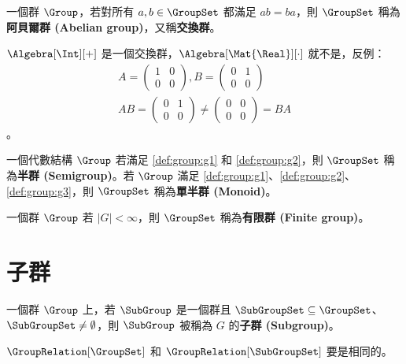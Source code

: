 \documentclass[12pt,a4paper,oneside]{report}
\begin{document}
\begin{CJK}{UTF8}{bkai}
\begin{mydef}[阿貝爾群]
\label{def:group:abelian_group}
一個群 $\Group$，若對所有 $a,b\in{\GroupSet}$ 都滿足 $ab=ba$，則 $\GroupSet$ 稱為\textbf{阿貝爾群 (Abelian group)}，又稱\textbf{交換群}。
\end{mydef}
\begin{myexample}
$\Algebra[\Int][+]$ 是一個交換群，$\Algebra[\Mat{\Real}][\cdot]$ 就不是，反例：
\begin{align*}
A=\left(\begin{array}{cc}
1 & 0\\
0 & 0
\end{array}\right),
B=\left(\begin{array}{cc}
0 & 1\\
0 & 0
\end{array}\right)\\
AB=\left(\begin{array}{cc}
0 & 1\\
0 & 0
\end{array}\right)\neq\left(\begin{array}{cc}
0 & 0\\
0 & 0
\end{array}\right)=BA
\end{align*}
。
\end{myexample}

\begin{mydef}[半群和單半群]
\label{def:group:semigroup_and_monoid}
一個代數結構 $\Group$ 若滿足 \ref{def:group:g1} 和 \ref{def:group:g2}，則 $\GroupSet$ 稱為\textbf{半群 (Semigroup)}。若 $\Group$ 滿足 \ref{def:group:g1}、\ref{def:group:g2}、\ref{def:group:g3}，則 $\GroupSet$ 稱為\textbf{單半群 (Monoid)}。
\end{mydef}

\begin{mydef}[有限群]
\label{def:group:finite_group}
一個群 $\Group$ 若 $|G|<\infty$，則 $\GroupSet$ 稱為\textbf{有限群 (Finite group)}。
\end{mydef}

\section{子群}

\begin{mydef}[子群]
\label{def:group:subgroup}
一個群 $\Group$ 上，若 $\SubGroup$ 是一個群且 $\SubGroupSet\subseteq{\GroupSet}$、$\SubGroupSet\neq{\emptyset}$，則 $\SubGroup$ 被稱為 $G$ 的\textbf{子群 (Subgroup)}。
\end{mydef}
\begin{mynote*}
$\GroupRelation[\GroupSet]$ 和 $\GroupRelation[\SubGroupSet]$ 要是相同的。
\end{mynote*}


\end{CJK}
\end{document}
